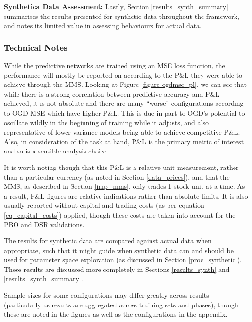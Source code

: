 \documentclass[a4paper,11pt,oneside]{article}
\theoremstyle{plain}
\theoremstyle{definition}
\begin{document}
	\textbf{Synthetica Data Assessment:} Lastly, Section \ref{results_synth_summary} summarises the results presented for synthetic data throughout the framework, and notes its limited value in assessing behaviours for actual data.
	
	\subsubsection{Technical Notes}
	
	While the predictive networks are trained using an MSE loss function, the performance will mostly be reported on according to the P\&L they were able to achieve through the MMS. Looking at Figure \ref{figure-ogdmse_pl}, we can see that while there is a strong correlation between predictive accuracy and P\&L achieved, it is not absolute and there are many ``worse'' configurations according to OGD MSE which have higher P\&L. This is due in part to OGD's potential to oscillate wildly in the beginning of training while it adjusts, and also representative of lower variance models being able to achieve competitive P\&L. Also, in consideration of the task at hand, P\&L is the primary metric of interest and so is a sensible analysis choice. \newline
	
	It is worth noting though that this P\&L is a relative unit measurement, rather than a particular currency (as noted in Section \ref{data_prices}), and that the MMS, as described in Section \ref{imp_mms}, only trades 1 stock unit at a time. As a result, P\&L figures are relative indications rather than absolute limits. It is also usually reported without capital and trading costs (as per equation \eqref{eq_capital_costs}) applied, though these costs are taken into account for the PBO and DSR validations. \newline

	The results for synthetic data are compared against actual data when appropriate, such that it might guide when synthetic data can and should be used for parameter space exploration (as discussed in Section \ref{proc_synthetic}). These results are discussed more completely in Sections \ref{results_synth} and \ref{results_synth_summary}.\newline

	Sample sizes for some configurations may differ greatly across results (particularly as results are aggregated across training sets and phases), though these are noted in the figures as well as the configurations in the appendix.\newline
	
\end{document}
